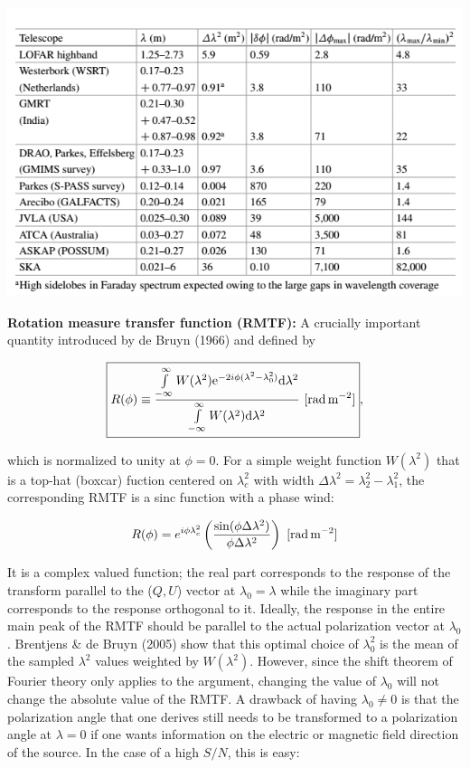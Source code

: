 \documentclass[a4paper,11pt]{article}
\begin{document}
\begin{table}[h]
\begin{center}
 \label{table:rmsynthesis}
\includegraphics[width=15cm]{figures/RMsynthesis.png}
\end{center}
\end{table}

{\noindent}\textbf{Rotation measure transfer function (RMTF):} A crucially important quantity introduced by de Bruyn (1966) and defined by

\begin{align*}
    \boxed{R(\phi) \equiv \dfrac{\int\limits_{-\infty}^\infty W(\lambda^2)\mathrm{e}^{-2i\phi(\lambda^2-\lambda_0^2)}\mathrm{d}\lambda^2}{\int\limits_{-\infty}^\infty W(\lambda^2)\mathrm{d}\lambda^2} ~ [{\rm rad\,m^{-2}}]},
\end{align*}

{\noindent}which is normalized to unity at $\phi=0$. For a simple weight function $W(\lambda^2)$ that is a top-hat (boxcar) fuction centered on $\lambda_c^2$ with width $\Delta\lambda^2 = \lambda_2^2-\lambda_1^2$, the corresponding RMTF is a sinc function with a phase wind:

\begin{align*}
    R(\phi) = e^{i\phi\lambda_c^2}\left(\dfrac{\sin(\phi\Delta\lambda^2)}{\phi\Delta\lambda^2}\right) ~ [{\rm rad\,m^{-2}}]
\end{align*}

It is a complex valued function; the real part corresponds to the response of the transform parallel to the ($Q,U$) vector at $\lambda_0=\lambda$ while the imaginary part corresponds to the response orthogonal to it. Ideally, the response in the entire main peak of the RMTF should be parallel to the actual polarization vector at $\lambda_0$. Brentjens \& de Bruyn (2005) show that this optimal choice of $\lambda_0^2$ is the mean of the sampled $\lambda^2$ values weighted by $W(\lambda^2)$. However, since the shift theorem of Fourier theory only applies to the argument, changing the value of $\lambda_0$ will not change the absolute value of the RMTF. A drawback of having $\lambda_0\neq0$ is that the polarization angle that one derives still needs to be transformed to a polarization angle at $\lambda=0$ if one wants information on the electric or magnetic field direction of the source. In the case of a high $S/N$, this is easy:
\end{document}
